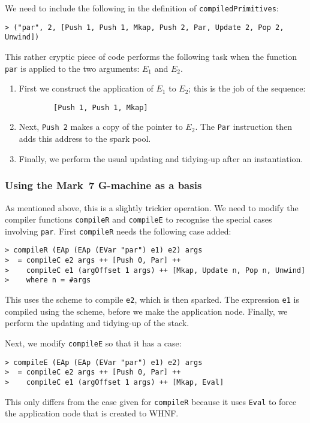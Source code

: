 We need to include the following in the definition of \mbox{\tt compiledPrimitives}:
\begin{verbatim}
> ("par", 2, [Push 1, Push 1, Mkap, Push 2, Par, Update 2, Pop 2, Unwind])
\end{verbatim}
This rather cryptic piece of code performs the following task when the
function \mbox{\tt par} is applied to the two arguments: $E_1$ and $E_2$.
\begin{enumerate}
\item First we construct the application of $E_1$ to $E_2$; this is
the job of the sequence:
\begin{verbatim}
        [Push 1, Push 1, Mkap]
\end{verbatim}

\item Next, \mbox{\tt Push\ 2} makes a copy of the pointer to $E_2$. The \mbox{\tt Par}
instruction then adds this address to the spark pool.

\item Finally, we perform the usual updating and tidying-up after an
instantiation.

\end{enumerate}

\subsubsection{Using the Mark~7 G-machine as a basis}

As mentioned above, this is a slightly trickier operation. We need to
modify the compiler functions \mbox{\tt compileR} and \mbox{\tt compileE} to recognise
the special cases involving \mbox{\tt par}. First \mbox{\tt compileR} needs the
following case added:
\begin{verbatim}
> compileR (EAp (EAp (EVar "par") e1) e2) args
>  = compileC e2 args ++ [Push 0, Par] ++
>    compileC e1 (argOffset 1 args) ++ [Mkap, Update n, Pop n, Unwind]
>    where n = #args
\end{verbatim}
%
This uses the \tC{} scheme to compile \mbox{\tt e2}, which is then sparked. The
expression \mbox{\tt e1} is compiled using the \tC{} scheme, before we make the
application node. Finally, we perform the updating and tidying-up of
the stack.

Next, we modify \mbox{\tt compileE} so that it has a case:
\begin{verbatim}
> compileE (EAp (EAp (EVar "par") e1) e2) args
>  = compileC e2 args ++ [Push 0, Par] ++
>    compileC e1 (argOffset 1 args) ++ [Mkap, Eval]
\end{verbatim}
%
This only differs from the case given for \mbox{\tt compileR} because it uses
\mbox{\tt Eval} to force the application node that is created to WHNF.

